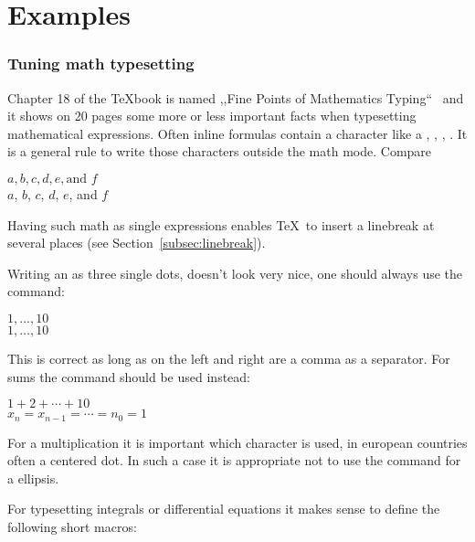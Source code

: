 \begin{table}[htb]

\part{Examples}
\section{Tuning math typesetting}
Chapter 18 of the \TeX book is named ,,Fine Points of Mathematics Typing``~\cite{knuth86}
and it 
shows on 20 pages some more or less important facts when typesetting mathematical 
expressions. Often inline formulas contain a  character like a
, , , \etc. It is a general rule to write
those characters outside the math mode. Compare

\begin{LTXexample}[preset=\raggedright,width=0.4\linewidth]
$a, b, c, d, e, \textrm{and }f$ \\[5pt]
$a$, $b$, $c$, $d$, $e$, and $f$ 
\end{LTXexample}

Having such math as single expressions enables \TeX\ to insert a linebreak at several
places (see Section~\vref{subsec:linebreak}). 

Writing an  as three single dots, doesn't look very nice, one should
always use the  command:

\begin{LTXexample}[preset=\raggedright,width=0.4\linewidth]
$1,...,10$\\[5pt]
$1,\ldots,10$
\end{LTXexample}

This is correct as long as on the left and right are a comma as a separator.
For sums the  command should be used instead:

\begin{LTXexample}[preset=\raggedright,width=0.4\linewidth]
$1+2+\cdots+10$\\[5pt]
$x_n=x_{n-1}=\cdots=n_0=1$
\end{LTXexample}

For a multiplication it is important which character is used, in european countries
often a centered dot. In such a case it is appropriate not to use the 
command for a ellipsis.

For typesetting integrals or differential equations 
it makes sense to define the following short macros:


\end{table}
